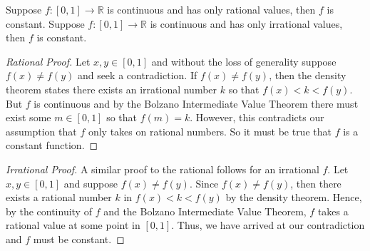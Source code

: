 \documentclass[12pt]{article}
\newcommand{\R}{\mathbb{R}}
\newenvironment{claim}[2][Claim]{\begin{trivlist}
		\item[\hskip \labelsep {\bfseries #1}\hskip \labelsep {\bfseries #2}]}{\end{trivlist}}
\begin{document}
\begin{claim}{5.3.17}
Suppose $f: [0,1] \rightarrow \R$ is continuous and has only rational values, then $f$ is constant.
Suppose $f: [0,1] \rightarrow \R$ is continuous and has only irrational values, then $f$ is constant.
\end{claim}
\begin{proof}[Rational Proof]
	Let $x,y \in [0,1]$ and without the loss of generality suppose $f(x) \neq f(y)$ and seek a contradiction. If $f(x) \neq f(y)$, then the density theorem states there exists an irrational number $k$ so that $f(x) <  k < f(y)$. But $f$ is continuous and by the Bolzano Intermediate Value Theorem there must exist some $m \in [0,1]$ so that $f(m) = k$. However, this contradicts our assumption that $f$ only takes on rational numbers. So it must be true that $f$ is a constant function.
\end{proof}
\begin{proof}[Irrational Proof]
	A similar proof to the rational follows for an irrational $f$. Let $x,y \in [0,1]$ and suppose $f(x) \neq f(y)$. Since $f(x) \neq f(y)$, then there exists a rational number $k$ in  $f(x) < k < f(y)$ by the density theorem. Hence, by the continuity of $f$ and the Bolzano Intermediate Value Theorem, $f$ takes a rational value at some point in $[0,1]$. Thus, we have arrived at our contradiction and $f$ must be constant.
\end{proof}
\end{document}
